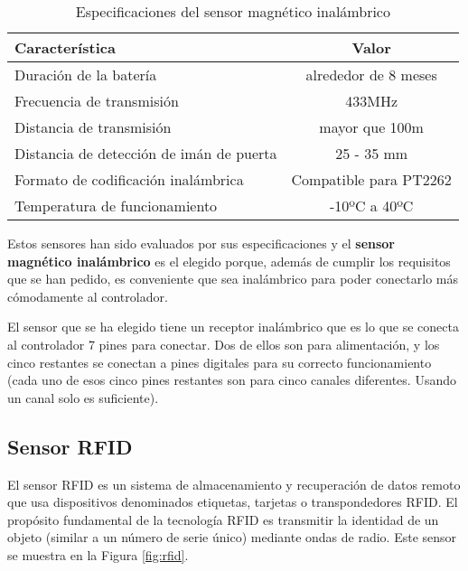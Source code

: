 \begin{enumerate}
\begin{table}[h]
    \centering
    \begin{tabular}{|l|c|}
        \rowcolor[gray]{.5}
        \hline
            \color{white}Característica&\color{white}Valor  \\
        \hline
            Duración de la batería & alrededor de 8 meses  \\
        \hline    
            Frecuencia de transmisión & 433MHz  \\
        \hline    
            Distancia de transmisión & mayor que 100m  \\
        \hline   
            Distancia de detección de imán de puerta & 25 - 35 mm  \\
        \hline    
            Formato de codificación inalámbrica & Compatible para PT2262  \\
        \hline    
            Temperatura de funcionamiento & -10ºC a 40ºC  \\
         \hline
    \end{tabular}
    \caption{Especificaciones del sensor magnético inalámbrico}
    \label{tab:magnéticoiesp}
\end{table}
\end{enumerate}

Estos sensores han sido evaluados por sus especificaciones y el \textbf{sensor magnético inalámbrico} es el elegido porque, además de cumplir los requisitos que se han pedido, es conveniente que sea inalámbrico para poder conectarlo más cómodamente al controlador.

El sensor que se ha elegido tiene un receptor inalámbrico que es lo que se conecta al controlador 7 pines para conectar. Dos de ellos son para alimentación, y los cinco restantes se conectan a pines digitales para su correcto funcionamiento (cada uno de esos cinco pines restantes son para cinco canales diferentes. Usando un canal solo es suficiente).

\subsection{Sensor RFID}

El sensor RFID es un sistema de almacenamiento y recuperación de datos remoto que usa dispositivos denominados etiquetas, tarjetas o transpondedores RFID. El propósito fundamental de la tecnología RFID es transmitir la identidad de un objeto (similar a un número de serie único) mediante ondas de radio. Este sensor se muestra en la Figura \ref{fig:rfid}.

